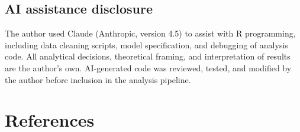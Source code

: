 \documentclass[Review,times,sageh,doublespace]{sagej}
\begin{document}
\newpage

\subsection*{AI assistance disclosure}\label{ai-assistance-disclosure}

The author used Claude (Anthropic, version 4.5) to assist with R
programming, including data cleaning scripts, model specification, and
debugging of analysis code. All analytical decisions, theoretical
framing, and interpretation of results are the author's own.
AI-generated code was reviewed, tested, and modified by the author
before inclusion in the analysis pipeline.

\section*{References}\label{references}
\end{document}
